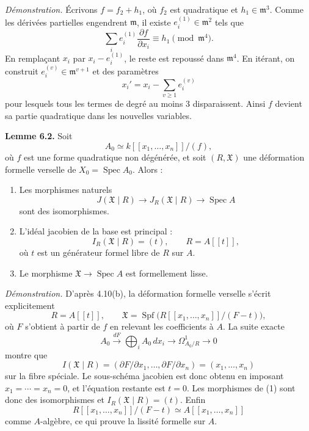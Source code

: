 \documentclass[11pt]{article}
\providecommand{\Spec}{\operatorname{Spec}}
\providecommand{\Spf}{\operatorname{Spf}}
\begin{document}
\emph{Démonstration.}  Écrivons \(f=f_2+h_1\), où \(f_2\) est quadratique et \(h_1\in\mathfrak m^3\).  Comme les dérivées partielles engendrent \(\mathfrak m\), il existe \(e_i^{(1)}\in\mathfrak m^2\) tels que
\[
        \sum_i e_i^{(1)}\frac{\partial f}{\partial x_i}
        \equiv h_1\pmod{\mathfrak m^4}.
\]
En remplaçant \(x_i\) par \(x_i-e_i^{(1)}\), le reste est repoussé dans \(\mathfrak m^4\).  En itérant, on construit \(e_i^{(v)}\in\mathfrak m^{v+1}\) et des paramètres
\[
        x_i' = x_i-\sum_{v\geq 1}e_i^{(v)}
\]
pour lesquels tous les termes de degré au moins \(3\) disparaissent.  Ainsi \(f\) devient sa partie quadratique dans les nouvelles variables.

\textbf{Lemme 6.2.}  Soit
\[
        A_0\simeq k[[x_1,\ldots,x_n]]/(f),
\]
où \(f\) est une forme quadratique non dégénérée, et soit \((R,\mathfrak X)\) une déformation formelle verselle de \(X_0=\Spec A_0\).  Alors :
\begin{enumerate}[label=(\arabic*)]
\item Les morphismes naturels
\[
        J(\mathfrak X\mid R)\longrightarrow J_R(\mathfrak X\mid R)
        \longrightarrow \Spec A
\]
sont des isomorphismes.
\item L'idéal jacobien de la base est principal :
\[
        I_R(\mathfrak X\mid R)=(t),
        \qquad
        R=A[[t]],
\]
où \(t\) est un générateur formel libre de \(R\) sur \(A\).
\item Le morphisme \(\mathfrak X\to\Spec A\) est formellement lisse.
\end{enumerate}

\emph{Démonstration.}  D'après 4.10(b), la déformation formelle verselle s'écrit explicitement
\[
        R=A[[t]],\qquad
        \mathfrak X=
        \Spf\bigl(R[[x_1,\ldots,x_n]]/(F-t)\bigr),
\]
où \(F\) s'obtient à partir de \(f\) en relevant les coefficients à \(A\).  La suite exacte
\[
        A_0\xrightarrow{dF}
        \bigoplus_i A_0\,dx_i
        \longrightarrow
        \Omega^1_{A_0/R}
        \longrightarrow 0
\]
montre que
\[
        I(\mathfrak X\mid R)=(\partial F/\partial x_1,\ldots,\partial F/\partial x_n)
        =(x_1,\ldots,x_n)
\]
sur la fibre spéciale.  Le sous-schéma jacobien est donc obtenu en imposant \(x_1=\cdots=x_n=0\), et l'équation restante est \(t=0\).  Les morphismes de (1) sont donc des isomorphismes et \(I_R(\mathfrak X\mid R)=(t)\).  Enfin
\[
        R[[x_1,\ldots,x_n]]/(F-t)
        \simeq
        A[[x_1,\ldots,x_n]]
\]
comme \(A\)-algèbre, ce qui prouve la lissité formelle sur \(A\).
\end{document}
